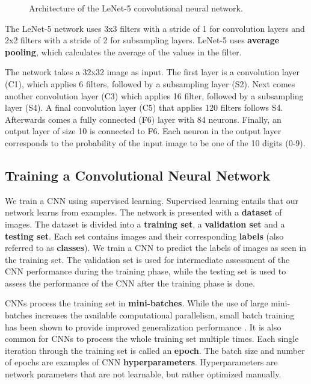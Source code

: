 \begin{figure}[H]
\centering
{}
\caption[Architecture of the LeNet-5 convolutional neural network.]{Architecture of the LeNet-5 convolutional neural network.\cite{lecun1989backpropagation}}
\label{fig:lenet5}
\end{figure}

The LeNet-5 network uses 3x3 filters with a stride of 1 for convolution layers and 2x2 filters with a stride of 2 for subsampling layers. LeNet-5 uses \textbf{average pooling}, which calculates the average of the values in the filter.

The network takes a 32x32 image as input. The first layer is a convolution layer (C1), which applies 6 filters, followed by a subsampling layer (S2). Next comes another convolution layer (C3) which applies 16 filter, followed by a subsampling layer (S4). A final convolution layer (C5) that applies 120 filters follows S4. Afterwards comes a fully connected (F6) layer with 84 neurons. Finally, an output layer of size 10 is connected to F6. Each neuron in the output layer corresponds to the probability of the input image to be one of the 10 digits (0-9).

\subsection{Training a Convolutional Neural Network}
We train a CNN using supervised learning. Supervised learning entails that our network learns from examples. The network is presented with a \textbf{dataset} of images. The dataset is divided into a \textbf{training set}, a \textbf{validation set} and a \textbf{testing set}. Each set contains images and their corresponding \textbf{labels} (also referred to as \textbf{classes}). We train a CNN to predict the labels of images as seen in the training set. The validation set is used for intermediate assessment of the CNN performance during the training phase, while the testing set is used to assess the performance of the CNN after the training phase is done.

CNNs process the training set in \textbf{mini-batches}. While the use of large mini-batches increases the available computational parallelism, small batch training has been shown to provide improved generalization performance \cite{masters2018revisiting}. It is also common for CNNs to process the whole training set multiple times. Each single iteration through the training set is called an \textbf{epoch}. The batch size and number of epochs are examples of CNN \textbf{hyperparameters}. Hyperparameters are network parameters that are not learnable, but rather optimized manually.

